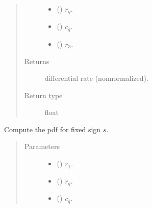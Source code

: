 \documentclass[letterpaper,10pt,english]{sphinxmanual}
\begin{document}
\begin{fulllineitems}
\begin{fulllineitems}
\begin{quote}
\begin{description}
\begin{itemize}
\item {} 
 () \textendash{} \(r_q\).

\item {} 
 () \textendash{} \(c_q\).

\item {} 
 () \textendash{} \(r_3\).

\end{itemize}

\item[{Returns}] \leavevmode
differential rate (non\sphinxhyphen{}normalized).

\item[{Return type}] \leavevmode
float

\end{description}\end{quote}

\end{fulllineitems}


\begin{fulllineitems}
\label{\detokenize{code_structure:scdc.initial.distribution.integral.RateIntegrator.pdf_fixed_sign}}
Compute the pdf for fixed sign \(s\).
\begin{quote}\begin{description}
\item[{Parameters}] \leavevmode\begin{itemize}
\item {} 
 () \textendash{} \(r_1\).

\item {} 
 () \textendash{} \(r_q\).

\item {} 
 () \textendash{} \(c_q\).


\end{itemize}
\end{description}
\end{quote}
\end{fulllineitems}
\end{fulllineitems}
\end{document}
